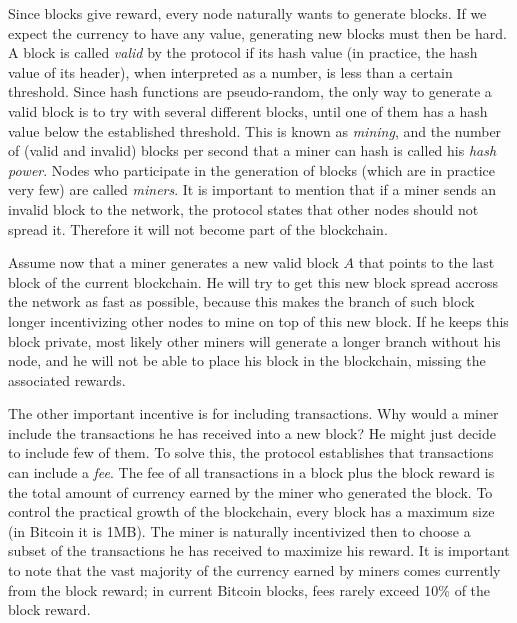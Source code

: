 Since blocks give reward, every node naturally wants to generate blocks. If we expect the currency to have any value, generating new blocks must then be hard. A block is called \emph{valid} by the protocol if its hash value (in practice, the hash value of its header), when interpreted as a number, is less than a certain threshold. Since hash functions are pseudo-random, the only way to generate a valid block is to try with several different blocks, until one of them has a hash value below the established threshold. This is known as \emph{mining}, and the number of (valid and invalid) blocks per second that a miner can hash is called his \emph{hash power}. Nodes who participate in the generation of blocks (which are in practice very few) are called \emph{miners}. It is important to mention that if a miner sends an invalid block to the network, the protocol states that other nodes should not spread it. Therefore it will not become part of the blockchain.

Assume now that a miner generates a new valid block $A$ that points to the last block of the current blockchain. He will try to get this new block spread accross the network as fast as possible, because this makes the branch of such block longer incentivizing other nodes to mine on top of this new block. If he keeps this block private, most likely other miners will generate a longer branch without his node, and he will not be able to place his block in the blockchain, missing the associated rewards.

The other important incentive is for including transactions. Why would a miner include the transactions he has received into a new block? He might just decide to include few of them. To solve this, the protocol establishes that transactions can include a \emph{fee}. The fee of all transactions in a block plus the block reward is the total amount of currency earned by the miner who generated the block. To control the practical growth of the blockchain, every block has a maximum size (in Bitcoin it is 1MB). The miner is naturally incentivized then to choose a subset of the transactions he has received to maximize his reward. It is important to note that the vast majority of the currency earned by miners comes currently from the block reward; in current Bitcoin blocks, fees rarely exceed 10\% of the block reward.

